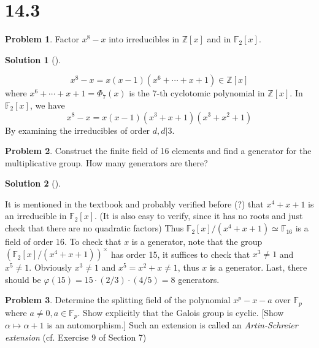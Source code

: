 \documentclass{article}
\theoremstyle{definition}
\newtheorem{prob}{Problem}
\newtheorem*{sol}{Solution}
\newenvironment{sols}[1][]{%
  \begin{sol}[#1]$ $\par\nobreak\ignorespaces
}{%
  \end{sol}
}
\newcommand{\FF}{\mathbb F}
\newcommand{\ZZ}{\mathbb Z}
\begin{document}
\section*{14.3}

\setcounter{prob}{0}
\begin{prob}
	Factor $x^8 - x$ into irreducibles in $\ZZ[x]$ and in $\FF_2[x]$.
\end{prob}

\begin{sols}
	\[
		x^8 - x = x (x - 1) (x^6 + \cdots + x + 1) \in \ZZ[x]
	\]
	where $x^6 + \cdots + x + 1 = \Phi_7(x)$ is the 7-th cyclotomic polynomial in $\ZZ[x]$.
	In $\FF_2[x]$, we have
	\[
		x^8 - x = x (x - 1) (x^3 + x + 1) (x^3 + x^2 + 1)
	\]
	By examining the irreducibles of order $d, d | 3$.
\end{sols}

\setcounter{prob}{3}
\begin{prob}
	Construct the finite field of 16 elements and find a generator for the multiplicative group.
	How many generators are there?
\end{prob}

\begin{sols}
	It is mentioned in the textbook and probably verified before (?) that $x^4 + x + 1$ is an irreducible in $\FF_2[x]$.
	(It is also easy to verify, since it has no roots and just check that there are no quadratic factors) 
	Thus $\FF_2[x]/(x^4 + x + 1) \simeq \FF_{16}$ is a field of order $16$.
	To check that $x$ is a generator, note that the group $(\FF_2[x]/(x^4 + x + 1))^\times$ has order 15, it suffices to check that $x^3 \neq 1$ and $x^5 \neq 1$.
	Obviously $x^3 \neq 1$ and $x^5 = x^2 + x \neq 1$, thus $x$ is a generator.
	Last, there should be $\varphi(15) = 15 \cdot (2/3) \cdot (4/5) = 8$ generators.
\end{sols}

\setcounter{prob}{7}
\begin{prob}
	Determine the splitting field of the polynomial $x^p - x - a$ over $\FF_p$ where $a \neq 0, a \in \FF_p$.
	Show explicitly that the Galois group is cyclic.
	[Show $\alpha \mapsto \alpha + 1$ is an automorphism.]
	Such an extension is called an \textit{Artin-Schreier extension} (cf. Exercise 9 of Section 7)
\end{prob}
\end{document}
